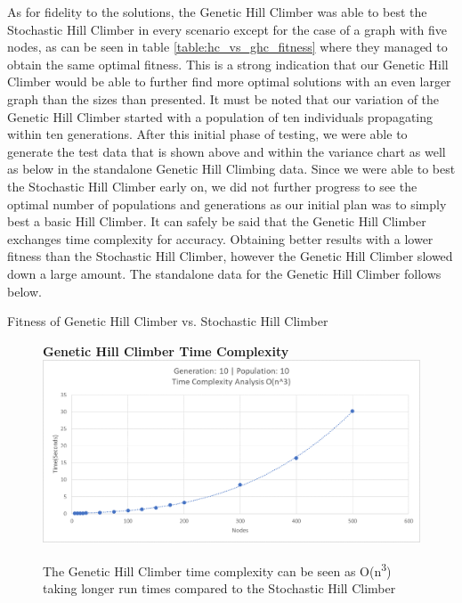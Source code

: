 \documentclass[sigplan,screen]{acmart}
\begin{document}
As for fidelity to the solutions, the Genetic Hill Climber was able to best the
Stochastic Hill Climber in every scenario except for the case of a graph with
five nodes, as can be seen in table \ref{table:hc_vs_ghc_fitness} where they
managed to obtain the same optimal fitness. This is a strong indication that our
Genetic Hill Climber would be able to further find more optimal solutions with
an even larger graph than the sizes than presented. It must be noted that our
variation of the Genetic Hill Climber started with a population of ten
individuals propagating within ten generations. After this initial phase of
testing, we were able to generate the test data that is shown above and within
the variance chart as well as below in the standalone Genetic Hill Climbing
data. Since we were able to best the Stochastic Hill Climber early on, we did
not further progress to see the optimal number of populations and generations as
our initial plan was to simply best a basic Hill Climber. It can safely be said
that the Genetic Hill Climber exchanges time complexity for accuracy. Obtaining
better results with a lower fitness than the Stochastic Hill Climber, however
the Genetic Hill Climber slowed down a large amount. The standalone data for the
Genetic Hill Climber follows below.

\begin{table}[h]
    \centering
    
    \caption{Fitness of Genetic Hill Climber vs. Stochastic Hill Climber}
    \label{table:hc_vs_ghc_fitness}
\end{table}

\begin{figure}[h]
    \centering
    \textbf{Genetic Hill Climber Time Complexity}
    \includegraphics[width=\columnwidth]{assets/ghc_graph.png}
    \caption{The Genetic Hill Climber time complexity can be seen as
        O(n\textsuperscript{3}) taking longer run times compared to the
        Stochastic Hill Climber}
    \label{fig:ghc_timecomplexity}
\end{figure}
\end{document}
